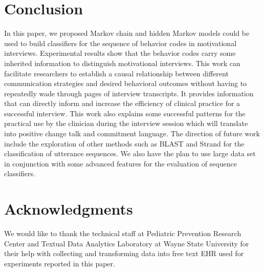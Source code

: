 \documentclass{amia}
\begin{document}
\section*{Conclusion}
In this paper, we proposed Markov chain and hidden Markov models could be used to build classifiers for the sequence of behavior codes in motivational interviews. Experimental results show that the behavior codes carry some inherited information to distinguish motivational interviews. This work can facilitate researchers to establish a causal relationship between different communication strategies and desired behavioral outcomes without having to repeatedly wade through pages of interview transcripts. It provides information that can directly inform and increase the efficiency of clinical practice for a successful interview. This work also explains some successful patterns for the practical use by the clinician during the interview session which will translate into positive change talk and commitment language. The direction of future work include the exploration of other methods such as BLAST \cite{altschul1990basic} and Strand \cite{drew2014strand} for the classification of utterance sequences. We also have the plan to use large data set in conjunction with some advanced features for the evaluation of sequence classifiers. 


\section*{Acknowledgments}
We would like to thank the technical staff at Pediatric Prevention Research Center and Textual Data Analytics Laboratory at Wayne State University for their help with collecting and transforming data into free text EHR used for experiments reported in this paper. 



\end{document}
